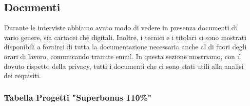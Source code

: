 \documentclass{elegantbook}
\begin{document}
	\subsection{Documenti}
	
	Durante le interviste abbiamo avuto modo di vedere in presenza documenti di vario genere, sia cartacei che digitali. Inoltre, i tecnici e i titolari si sono mostrati
        disponibili a fornirci di tutta la documentazione necessaria anche al di fuori degli orari di lavoro, comunicando tramite email. In questa sezione mostriamo, con il
        dovuto rispetto della privacy, tutti i documenti che ci sono stati utili alla analisi dei requisiti.
	\subsubsection{Tabella Progetti "Superbonus 110\%"}
	
\end{document}
